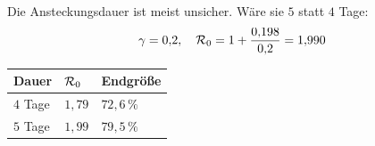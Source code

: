 \begin{aufgabe}
Die Ansteckungsdauer ist meist unsicher. Wäre sie $5$ statt $4$ Tage:
\[ \gamma = 0{,}2, \quad \mathcal{R}_0 = 1 + \frac{0{,}198}{0{,}2} = 1{,}990 \]
\begin{center}
\renewcommand{\arraystretch}{1.48}
\begin{tabular}{@{}P{2.6cm}P{2.2cm}P{2.2cm}@{}}
\toprule
\textbf{Dauer} & $\mathcal{R}_0$ & \textbf{Endgröße}\\
\midrule
$4$ Tage & $1{,}79$ & $72{,}6\,\%$\\
$5$ Tage & $1{,}99$ & $79{,}5\,\%$\\
\bottomrule
\end{tabular}
\end{center}

\begin{center}
\begin{minipage}{0.86\textwidth}
\end{minipage}
\end{center}
\end{aufgabe}

